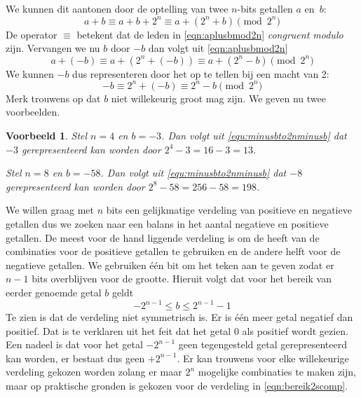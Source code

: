 \documentclass[a4paper,12pt,oneside]{article}
\theoremstyle{own}
\newtheorem{example}{Voorbeeld}[section]
\begin{document}
We kunnen dit aantonen door de optelling van twee
$n$-bits getallen $a$ en~$b$:
%
\begin{equation}
\label{eqn:aplusbmod2n}
a + b \equiv a + b + 2^n \equiv a + (2^n + b) \pmod{2^n}
\end{equation}
%
De operator $\equiv$ betekent dat de leden in \eqref{eqn:aplusbmod2n}
\textsl{congruent modulo} zijn.
%
Vervangen we nu $b$ door $-b$ dan volgt uit \eqref{eqn:aplusbmod2n}
%
\begin{equation}
\label{eqn:aminbisaplus2nminb}
a + (-b) \equiv a + (2^n + (- b)) \equiv a + (2^n - b) \pmod{2^n}
\end{equation}
%
We kunnen $-b$ dus representeren door het op te tellen bij een macht van 2:
%
\begin{equation}
\label{equ:minusbto2nminusb}
-b \equiv 2^n + (-b) \equiv 2^n - b \pmod{2^n}
\end{equation}
%
Merk trouwens op dat $b$ niet willekeurig groot mag zijn.
We geven nu twee voorbeelden.

\hrulefill
\begin{example}
\label{exa:convdecto2scomp}
Stel $n = 4$ en $b = -3$. Dan volgt uit \eqref{equ:minusbto2nminusb} dat $-3$
gerepresenteerd kan worden door $2^4-3 = 16 - 3 = 13$.

Stel $n = 8$ en $b = -58$. Dan volgt uit \eqref{equ:minusbto2nminusb} dat $-8$
gerepresenteerd kan worden door $2^8-58 = 256 - 58 = 198$.
\end{example}%
\unskip\hrulefill


We willen graag met $n$ bits een gelijkmatige verdeling van positieve en
negatieve getallen dus we zoeken naar een balans in het aantal negatieve
en positieve getallen. De meest voor de hand liggende verdeling is om de
heeft van de combinaties voor de positieve getallen te gebruiken en de
andere helft voor de negatieve getallen. We gebruiken \'e\'en bit om het
teken aan te geven zodat er $n-1$ bits overblijven voor de grootte.
Hieruit volgt dat voor het bereik van eerder genoemde getal $b$ geldt
%
\begin{equation}
\label{eqn:bereik2scomp}
-2^{n-1} \leq b \leq 2^{n-1}-1
\end{equation}
%
Te zien is dat de verdeling niet symmetrisch is. Er is \'e\'en meer getal
negatief dan positief. Dat is te verklaren uit het feit dat het getal 0
als positief wordt gezien. Een nadeel is dat voor het getal $-2^{n-1}$ geen
tegengesteld getal gerepresenteerd kan worden, er bestaat dus geen $+2^{n-1}$.
Er kan trouwens voor elke willekeurige verdeling%
gekozen worden zolang er maar $2^n$ mogelijke combinaties te maken
zijn, maar op praktische gronden is gekozen voor de verdeling
in \eqref{eqn:bereik2scomp}.
\end{document}
